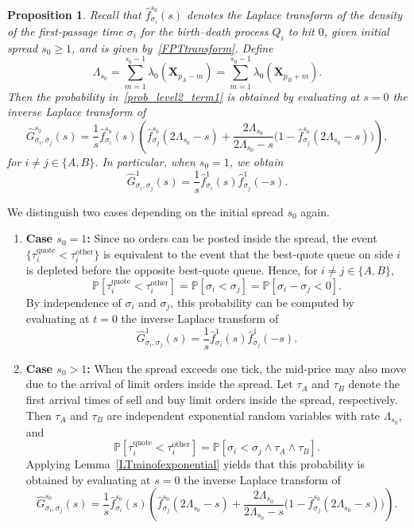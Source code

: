 \documentclass[11pt]{article}
\newtheorem{proposition}{Proposition}
\newenvironment{proof}{\noindent{\it Proof.}}{\hfill\fbox{}\vspace*{1mm}}
\begin{document}
\begin{proposition}\label{prop_1_level2}
Recall that $\hat{f}^{s_0}_{\sigma_i}(s)$ denotes the Laplace transform of the density of the first-passage time $\sigma_i$ for the birth--death process $Q_i$ to hit $0$, given initial spread $s_0\geq 1$, and is given by~\eqref{FPTtransform}. Define
\[
\Lambda_{s_0}
=
\sum_{m=1}^{s_0-1}\lambda_0(\boldsymbol{X}_{p_A-m})
=
\sum_{m=1}^{s_0-1}\lambda_0(\boldsymbol{X}_{p_B+m}).
\]
Then the probability in~\eqref{prob_level2_term1} is obtained by evaluating at $s=0$ the inverse Laplace transform of
\begin{equation}
\hat{G}_{\sigma_i,\sigma_j}^{s_0}(s)
=
\frac{1}{s}\hat{f}_{\sigma_i}^{s_0}(s)
\left(
\hat{f}_{\sigma_j}^{s_0}(2\Lambda_{s_0}-s)
+
\frac{2\Lambda_{s_0}}{2\Lambda_{s_0}-s}
\bigl(1-\hat{f}_{\sigma_j}^{s_0}(2\Lambda_{s_0}-s)\bigr)
\right),
\end{equation}
for $i\neq j\in\{A,B\}$. In particular, when $s_0=1$, we obtain
\begin{equation}
\hat{G}_{\sigma_i,\sigma_j}^{1}(s)
=
\frac{1}{s}\hat{f}_{\sigma_i}^{1}(s)\hat{f}_{\sigma_j}^{1}(-s).
\end{equation}
\end{proposition}

\begin{proof}
We distinguish two cases depending on the initial spread $s_0$ again.

\begin{enumerate}
\item[\textbf{(i)}] \textbf{Case \( s_0 = 1 \):}
Since no orders can be posted inside the spread, the event $\{\tau_i^{\text{quote}}<\tau_i^{\text{other}}\}$ is equivalent to the event that the best-quote queue on side $i$ is depleted before the opposite best-quote queue. Hence, for $i\neq j\in\{A,B\}$,
\[
\mathbb{P}[\tau_i^{\text{quote}}<\tau_i^{\text{other}}]
=
\mathbb{P}[\sigma_i<\sigma_j]
=
\mathbb{P}[\sigma_i-\sigma_j<0].
\]
By independence of $\sigma_i$ and $\sigma_j$, this probability can be computed by evaluating at $t=0$ the inverse Laplace transform of
\[
\hat{G}_{\sigma_i,\sigma_j}^{1}(s)
=
\frac{1}{s}\hat{f}_{\sigma_i}^{1}(s)\hat{f}_{\sigma_j}^{1}(-s).
\]

\item[\textbf{(ii)}] \textbf{Case \( s_0 > 1 \):}
When the spread exceeds one tick, the mid-price may also move due to the arrival of limit orders inside the spread. Let $\tau_A$ and $\tau_B$ denote the first arrival times of sell and buy limit orders inside the spread, respectively. Then $\tau_A$ and $\tau_B$ are independent exponential random variables with rate $\Lambda_{s_0}$, and
\[
\mathbb{P}[\tau_i^{\text{quote}}<\tau_i^{\text{other}}]
=
\mathbb{P}[\sigma_i<\sigma_j\wedge\tau_A\wedge\tau_B].
\]
Applying Lemma~\ref{LTminofexponential} yields that this probability is obtained by evaluating at $s=0$ the inverse Laplace transform of
\[
\hat{G}_{\sigma_i,\sigma_j}^{s_0}(s)
=
\frac{1}{s}\hat{f}_{\sigma_i}^{s_0}(s)
\left(
\hat{f}_{\sigma_j}^{s_0}(2\Lambda_{s_0}-s)
+
\frac{2\Lambda_{s_0}}{2\Lambda_{s_0}-s}
\bigl(1-\hat{f}_{\sigma_j}^{s_0}(2\Lambda_{s_0}-s)\bigr)
\right).
\]
\end{enumerate}
\end{proof}
\end{document}
